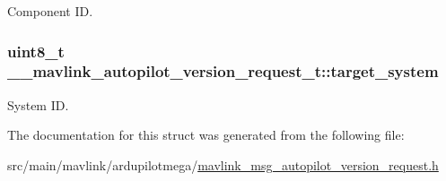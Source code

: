 Component I\+D. 

\hypertarget{struct____mavlink__autopilot__version__request__t_abe2ab85f583d911e5a7312b51aab7569}{
\subsubsection[{target\+\_\+system}]{\setlength{\rightskip}{0pt plus 5cm}uint8\+\_\+t \+\_\+\+\_\+mavlink\+\_\+autopilot\+\_\+version\+\_\+request\+\_\+t\+::target\+\_\+system}}\label{struct____mavlink__autopilot__version__request__t_abe2ab85f583d911e5a7312b51aab7569}


System I\+D. 



The documentation for this struct was generated from the following file\+:\begin{DoxyCompactItemize}
\item 
src/main/mavlink/ardupilotmega/\hyperlink{mavlink__msg__autopilot__version__request_8h}{mavlink\+\_\+msg\+\_\+autopilot\+\_\+version\+\_\+request.\+h}\end{DoxyCompactItemize}
